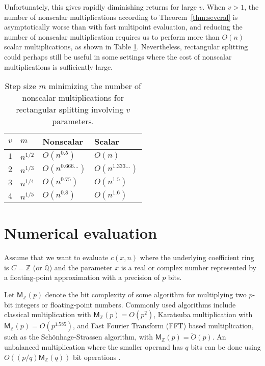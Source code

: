 \documentclass{sig-alternate}
\newcommand   \OOsoft {\tilde O}
\begin{document}
Unfortunately, this gives rapidly diminishing returns for large $v$.
When $v > 1$, the number of nonscalar multiplications
according to Theorem~\ref{thm:several} is
asymptotically worse than with fast multipoint evaluation,
and reducing the number of nonscalar multiplication
requires us to perform more than $O(n)$ scalar multiplications,
as shown in Table \ref{tab:dimension}.
Nevertheless, rectangular splitting could perhaps still be useful
in some settings where the cost of nonscalar
multiplications is sufficiently large.

\begin{table}[ht!]
\centering
\begin{tabular}{ l | l l l }
$v$ & $m$ & Nonscalar & Scalar\\ \hline
$1$ & $n^{1/2}$ & $O(n^{0.5})$ & $O(n)$ \\
$2$ & $n^{1/3}$ & $O(n^{0.666\ldots})$ & $O(n^{1.333\ldots})$ \\
$3$ & $n^{1/4}$ & $O(n^{0.75})$ & $O(n^{1.5})$ \\
$4$ & $n^{1/5}$ & $O(n^{0.8})$ & $O(n^{1.6})$ \\
\end{tabular}
\caption{Step size $m$ minimizing the number of
nonscalar multiplications for rectangular splitting involving $v$ parameters.}
\label{tab:dimension}
\end{table}

\section{Numerical evaluation} \label{sect:numerical}

Assume that we want to evaluate $c(x,n)$
where the underlying coefficient ring is
$C = \mathbb{Z}$ (or $\overline{\mathbb{Q}}$)
and the parameter $x$ is a real or complex number
represented by a floating-point approximation with
a precision of $p$ bits.

Let $\mathsf{M}_{\mathbb{Z}}(p)$ denote the bit complexity of some algorithm
for multiplying two $p$-bit integers or floating-point numbers. Commonly
used algorithms include classical multiplication with
$\mathsf{M}_{\mathbb{Z}}(p) = O(p^2)$, Karatsuba multiplication with
$\mathsf{M}_{\mathbb{Z}}(p) = O(p^{1.585})$, and
Fast Fourier Transform (FFT) based multiplication,
such as the Sch\"{o}nhage-Strassen algorithm, with
$\mathsf{M}_{\mathbb{Z}}(p) =  \OOsoft(p)$.
An unbalanced multiplication where the smaller operand has
$q$ bits can be done using
$O((p/q) \mathsf{M}_{\mathbb{Z}}(q))$ bit operations \cite{mca}.
\end{document}
